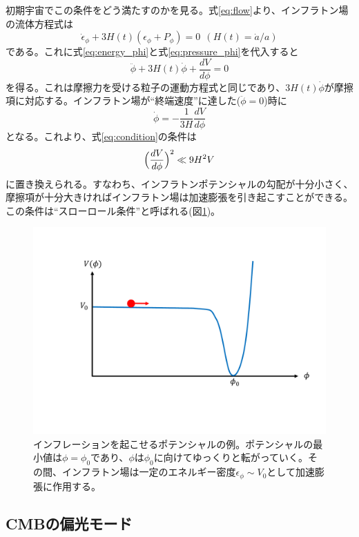 初期宇宙でこの条件をどう満たすのかを見る。式\eqref{eq:flow}より、インフラトン場の流体方程式は
\begin{equation}
  \dot\epsilon_{\phi} + 3H(t)(\epsilon_{\phi} + P_{\phi}) = 0  ~~ (H(t) = \dot{a}/a)
\end{equation}
である。これに式\eqref{eq:energy_phi}と式\eqref{eq:pressure_phi}を代入すると
\begin{equation}
  \ddot\phi + 3H(t)\dot\phi + \frac{dV}{d\phi} = 0
\end{equation}
を得る。これは摩擦力を受ける粒子の運動方程式と同じであり、$3H(t)\dot\phi$が摩擦項に対応する。インフラトン場が``終端速度''に達した($\ddot\phi = 0$)時に
\begin{equation}
  \dot\phi = -\frac{1}{3H}\frac{dV}{d\phi}
\end{equation}
となる。これより、式\eqref{eq:condition}の条件は
\begin{equation}
  \Bigl(\frac{dV}{d\phi}\Bigr)^{2} \ll 9H^{2}V
\end{equation}
に置き換えられる。すなわち、インフラトンポテンシャルの勾配が十分小さく、摩擦項が十分大きければインフラトン場は加速膨張を引き起こすことができる。この条件は``スローロール条件''と呼ばれる(図\ref{slow_roll})。
\begin{figure}[htbp]
  \centering
  \includegraphics[width=0.85\columnwidth]{2_cosmology/figs/slow_roll.pdf}
  \caption{インフレーションを起こせるポテンシャルの例。ポテンシャルの最小値は$\phi = \phi_{0}$であり、$\phi$は$\phi_{0}$に向けてゆっくりと転がっていく。その間、インフラトン場は一定のエネルギー密度$\epsilon_{\phi}\sim V_{0}$として加速膨張に作用する。}
  \label{slow_roll}
\end{figure}

\subsection{CMBの偏光モード}

